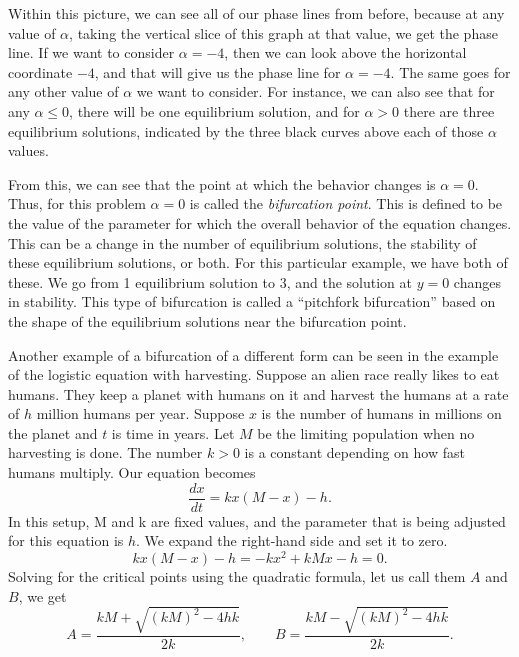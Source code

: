 \documentclass{ximera}
\begin{document}
Within this picture, we can see all of our phase lines from before, because at any value of $\alpha$, taking the vertical slice of this graph at that value, we get the phase line. If we want to consider $\alpha = -4$, then we can look above the horizontal coordinate $-4$, and that will give us the phase line for $\alpha = -4$. The same goes for any other value of $\alpha$ we want to consider. For instance, we can also see that for any $\alpha \leq 0$, there will be one equilibrium solution, and for $\alpha > 0$ there are three equilibrium solutions, indicated by the three black curves above each of those $\alpha$ values.  

From this, we can see that the point at which the behavior changes is $\alpha = 0$. Thus, for this problem $\alpha = 0$ is called the \emph{bifurcation point}. This is defined to be the value of the parameter for which the overall behavior of the equation changes. This can be a change in the number of equilibrium solutions, the stability of these equilibrium solutions, or both. For this particular example, we have both of these. We go from 1 equilibrium solution to 3, and the solution at $y=0$ changes in stability. This type of bifurcation is called a ``pitchfork bifurcation'' based on the shape of the equilibrium solutions near the bifurcation point. 

Another example of a bifurcation of a different form can be seen in the example of the logistic equation with harvesting. Suppose an alien race really likes to eat humans.  They keep a planet with humans on it and harvest the humans at a rate of $h$ million humans per year.  Suppose $x$ is the number of humans in millions on the planet and $t$ is time in years. Let $M$ be the limiting population when no harvesting is done.  The number $k > 0$ is a constant depending on how fast humans multiply.  Our equation becomes
\begin{equation*}
    \frac{dx}{dt} = kx(M-x) - h .
\end{equation*}
In this setup, M and k are fixed values, and the parameter that is being adjusted for this equation is $h$. We expand the right-hand side and set it to zero.
\begin{equation*}
    kx(M-x) - h = -kx^2+kMx - h  = 0.
\end{equation*}
Solving for the critical points using the quadratic formula, let us call them $A$ and $B$, we get
\begin{equation*}
    A = \frac{kM + \sqrt{{(kM)}^2 - 4hk}}{2k}, \qquad
    B = \frac{kM - \sqrt{{(kM)}^2 - 4hk}}{2k} .
\end{equation*}
\end{document}
